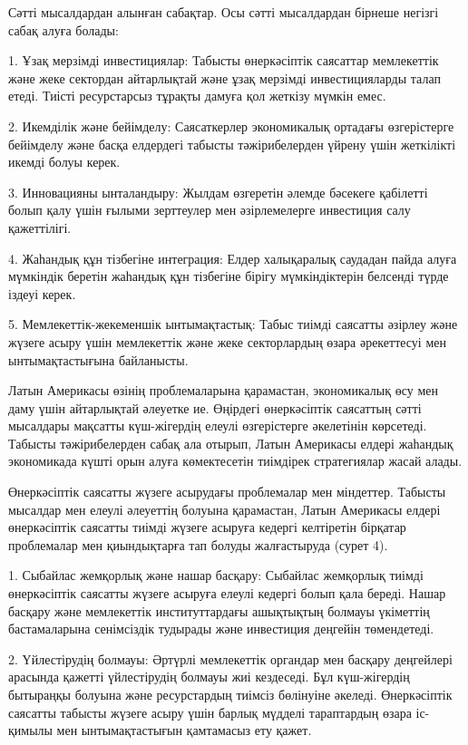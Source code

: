 \begin{multicols}{2}
Сәтті мысалдардан алынған сабақтар. Осы сәтті мысалдардан бірнеше
негізгі сабақ алуға болады:

1. Ұзақ мерзімді инвестициялар: Табысты өнеркәсіптік саясаттар
мемлекеттік және жеке сектордан айтарлықтай және ұзақ мерзімді
инвестицияларды талап етеді. Тиісті ресурстарсыз тұрақты дамуға қол
жеткізу мүмкін емес.

2. Икемділік және бейімделу: Саясаткерлер экономикалық ортадағы
өзгерістерге бейімделу және басқа елдердегі табысты тәжірибелерден
үйрену үшін жеткілікті икемді болуы керек.

3. Инновацияны ынталандыру: Жылдам өзгеретін әлемде бәсекеге қабілетті
болып қалу үшін ғылыми зерттеулер мен әзірлемелерге инвестиция салу
қажеттілігі.

4. Жаһандық құн тізбегіне интеграция: Елдер халықаралық саудадан пайда
алуға мүмкіндік беретін жаһандық құн тізбегіне бірігу мүмкіндіктерін
белсенді түрде іздеуі керек.

5. Мемлекеттік-жекеменшік ынтымақтастық: Табыс тиімді саясатты әзірлеу
және жүзеге асыру үшін мемлекеттік және жеке секторлардың өзара
әрекеттесуі мен ынтымақтастығына байланысты.

Латын Америкасы өзінің проблемаларына қарамастан, экономикалық өсу мен
даму үшін айтарлықтай әлеуетке ие. Өңірдегі өнеркәсіптік саясаттың сәтті
мысалдары мақсатты күш-жігердің елеулі өзгерістерге әкелетінін
көрсетеді. Табысты тәжірибелерден сабақ ала отырып, Латын Америкасы
елдері жаһандық экономикада күшті орын алуға көмектесетін тиімдірек
стратегиялар жасай алады.

Өнеркәсіптік саясатты жүзеге асырудағы проблемалар мен міндеттер.
Табысты мысалдар мен елеулі әлеуеттің болуына қарамастан, Латын
Америкасы елдері өнеркәсіптік саясатты тиімді жүзеге асыруға кедергі
келтіретін бірқатар проблемалар мен қиындықтарға тап болуды жалғастыруда
(сурет 4).

1. Сыбайлас жемқорлық және нашар басқару: Сыбайлас жемқорлық тиімді
өнеркәсіптік саясатты жүзеге асыруға елеулі кедергі болып қала береді.
Нашар басқару және мемлекеттік институттардағы ашықтықтың болмауы
үкіметтің бастамаларына сенімсіздік тудырады және инвестиция деңгейін
төмендетеді.

2. Үйлестірудің болмауы: Әртүрлі мемлекеттік органдар мен басқару
деңгейлері арасында қажетті үйлестірудің болмауы жиі кездеседі. Бұл
күш-жігердің бытыраңқы болуына және ресурстардың тиімсіз бөлінуіне
әкеледі. Өнеркәсіптік саясатты табысты жүзеге асыру үшін барлық мүдделі
тараптардың өзара іс-қимылы мен ынтымақтастығын қамтамасыз ету қажет.


\end{multicols}
